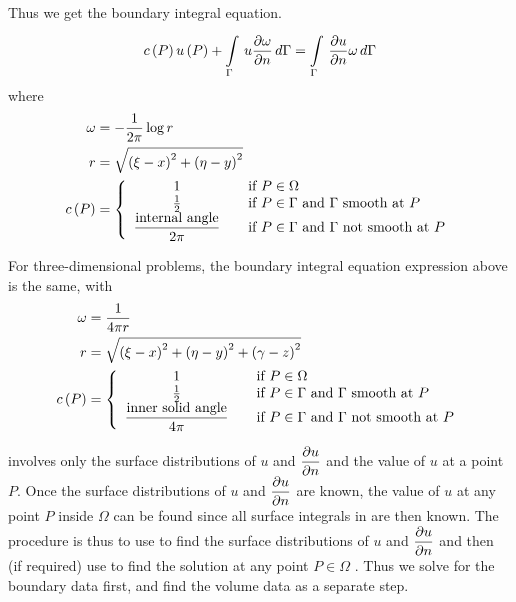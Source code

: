 Thus we get the boundary integral equation.
\begin{equation}
   c\left( P \right)   u\left( P \right)  +    \displaystyle\int\limits_{\Gamma}^{} \,u  \dfrac{\partial \omega}{\partial n} \,d\Gamma    = 
     \displaystyle\int\limits_{\Gamma}^{} \, \dfrac{\partial u}{\partial n}  \omega\,d\Gamma  
  \label{eqn:bie}
\end{equation}
where 
\begin{align*}
  \omega &= - \dfrac{1}{2 \pi} \log r \\
  r &= \sqrt{\left( \xi - x \right)^{2} + \left( \eta - y \right)^{2}}\\
   c\left( P \right)  &= \left\{ \begin{array}{cll}
      1 & & \text{if } P \in \Omega  \\
      \frac{1}{2} & &\text{if } P \in \Gamma \text{ and $\Gamma$ smooth at $P$}\\
      \dfrac{\text{internal angle}}{2 \pi} & & \text{if } P \in \Gamma 
      \text{ and $\Gamma$ not smooth at $P$}
    \end{array} \right.
\end{align*}

For three-dimensional problems, the boundary integral equation expression
above is the same, with
\begin{align*}
  \omega &= \dfrac{1}{4 \pi r} \\
  r &= \sqrt{\left( \xi - x \right)^{2} + \left( \eta - y \right)^{2} +\left( \gamma - z \right)^{2}} \\
   c\left( P \right)  &= \left\{ \begin{array}{cll}
      1 & & \text{if } P \in \Omega  \\
      \frac{1}{2} & & \text{if } P \in \Gamma \text{ and $\Gamma$ smooth at $P$}\\
      \dfrac{\text{inner solid angle}}{4 \pi} & & \text{if } P \in \Gamma  
      \text{ and $\Gamma$ not smooth at $P$}
    \end{array} \right.
\end{align*}

 involves only the surface distributions of $u$ and
$ \dfrac{\partial u}{\partial n} $ and the value of $u$ at a point $P$.  Once the surface
distributions of $u$ and $ \dfrac{\partial u}{\partial n} $ are known, the value of $u$ at
any point $P$ inside $\Omega$ can be found since all surface integrals in
 are then known. The procedure is thus to use  to
find the surface distributions of $u$ and $  \dfrac{\partial u}{\partial n} $ and then
(if required) use  to find the solution at any point $P \in
\Omega$ .  Thus we solve for the boundary data first, and find the volume data
as a separate step.

